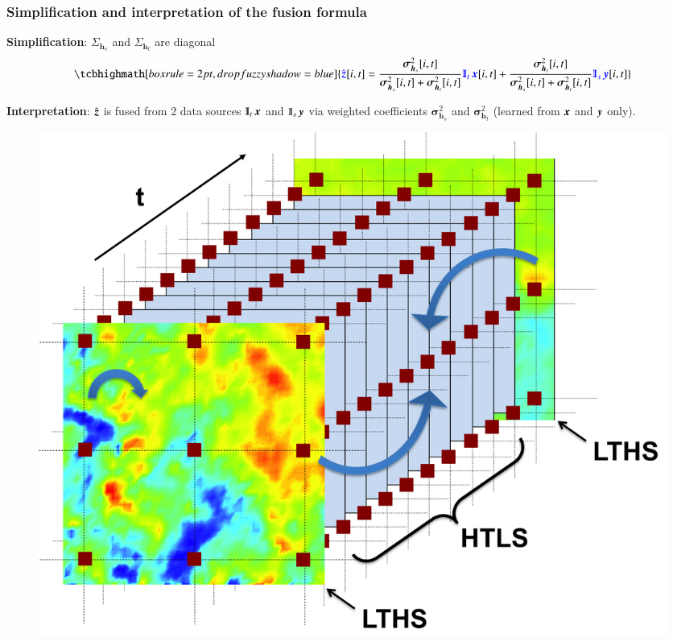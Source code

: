 \documentclass{beamer}
\begin{document}
\begin{frame}
\frametitle{Simplification and interpretation of the fusion formula} 
	\textbf{Simplification}: $ \Sigma_{\boldsymbol{h}_s} $ and $ \Sigma_{\boldsymbol{h}_t} $ are diagonal
	\begin{equation*}
		\tcbhighmath[boxrule=2pt,drop fuzzy shadow=blue]{\textcolor{blue}{\hat{\z }}[i,t]=\frac{\mybold{\sigma}^2_{\h_s}[i,t]}{\mybold{\sigma}^2_{\h_s}[i,t]+\mybold{\sigma}^2_{\h_t}[i,t]}\textcolor{blue}{\Interp_t\x} [i,t]+\frac{\mybold{\sigma}^2_{\h_t}[i,t]}{\mybold{\sigma}^2_{\h_s}[i,t]+\mybold{\sigma}^2_{\h_t}[i,t]}\textcolor{blue}{\Interp_s\y} [i,t]}
	\end{equation*} 
	\pause
	\begin{minipage}{\columnwidth}
		\begin{minipage}{0.55\columnwidth} 
			\textbf{Interpretation}: $ \hat{\operatorname{\boldsymbol{z}}}$ is fused from 2 data sources $\Interp_t\x$ and $\Interp_s \y$ via weighted coefficients $ \boldsymbol{\sigma}^2_{\boldsymbol{h}_s} $ and $ \boldsymbol{\sigma}^2_{\boldsymbol{h}_t} $ (learned from $ \operatorname{\boldsymbol{x}} $ and $ \operatorname{\boldsymbol{y}} $ only).
		\end{minipage}	
		\hspace{0.5cm}
		\begin{minipage}{0.3\columnwidth}
			\begin{figure}
				\includegraphics[width=\columnwidth]{./figures/experimentalsetup/experiment_setup_fusion.png}
			\end{figure}
		\end{minipage}
	\end{minipage}
\end{frame}
\end{document}
